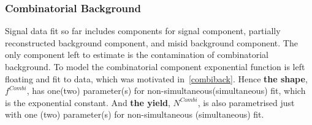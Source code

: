 \subsubsection{Combinatorial Background}
Signal data fit so far includes components for signal component, partially reconstructed background component, and misid background component. The only component left to estimate is the contamination of combinatorial background. To model the combinatorial component exponential function is left floating and fit to data, which was motivated in~\autoref{combiback}. Hence \textbf{the shape}, $f^{Combi}$, has one(two) parameter(s) for non-simultaneous(simultaneous) fit, which is the exponential constant. And \textbf{the yield}, $N^{Combi}$, is also parametrised just with one (two) parameter(s) for non-simultaneous (simultaneous) fit.

